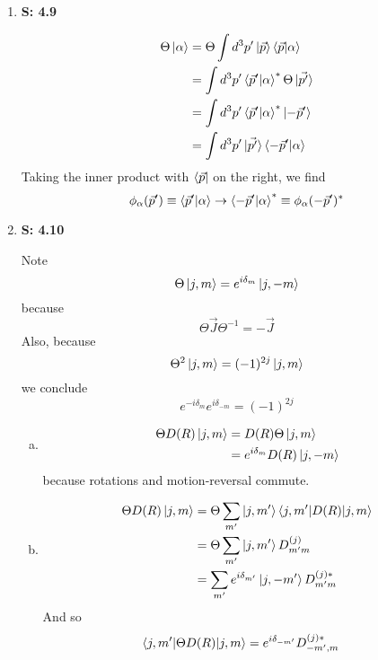 \documentclass[12pt, letterpaper]{article}
\begin{document}
\begin{enumerate}
\begin{enumerate}[(a)]
    \end{enumerate}
    
    \item[] \textbf{S: 4.9}
    
    \begin{align}
        \Theta \ket{\alpha}&=\Theta \int d^3p' \ket{\vec{p}}\braket{\vec{p}|\alpha}\\&=\int d^3p' \braket{\vec{p}'|\alpha}^*\Theta \ket{\vec{p'}}\\&=\int d^3 p' \braket{\vec{p}'|\alpha}^*\ket{-\vec{p}'}\\&=\int d^3p'\ket{\vec{p'}}\braket{-\vec{p}'|\alpha}
    \end{align}
    Taking the inner product with $\bra{\vec{p}}$ on the right, we find
    \begin{equation}
        \phi_\alpha(\vec{p}')\equiv \braket{\vec{p}'|\alpha}\rightarrow \braket{-\vec{p}'|\alpha}^*\equiv \phi_{\alpha}(-\vec{p}')^*
    \end{equation}
    
    \item[] \textbf{S: 4.10}
    
     
    Note
    \begin{equation}
        \Theta \ket{j,m}=e^{i\delta_m}\ket{j,-m}
    \end{equation}
    because 
    \begin{equation}
        \Theta \vec{J}\Theta^{-1}=-\vec{J}
    \end{equation}
    Also, because
    \begin{equation}
        \Theta^2\ket{j,m}=(-1)^{2j}\ket{j,m}
    \end{equation}
    we conclude
    \begin{equation}
        e^{-i\delta_m}e^{i\delta_{-m}}=(-1)^{2j}
    \end{equation}
     \begin{enumerate}[(a)]
        \item
        \begin{align}
            \Theta D(R)\ket{j,m}&=D(R)\Theta \ket{j,m} \\&=e^{i\delta_m} D(R) \ket{j,-m}
        \end{align}
        because rotations and motion-reversal commute.
        \item 
        \begin{align}
           \Theta D(R)\ket{j,m}&=\Theta \sum_{m'}\ket{j,m'}\braket{j,m'|D(R)|j,m}\\&=\Theta \sum_{m'}\ket{j,m'}D^{(j)}_{m'm}\\&=\sum_{m'}e^{i\delta_{m'}}\ket{j,-m'}D^{(j)*}_{m'm}
        \end{align}
        And so
        \begin{align}
            \braket{j,m'|\Theta D(R)|j,m}&=e^{i\delta_{-m'}}D^{(j)*}_{-m',m}
        \end{align}
        

\end{enumerate}
\end{enumerate}
\end{document}
